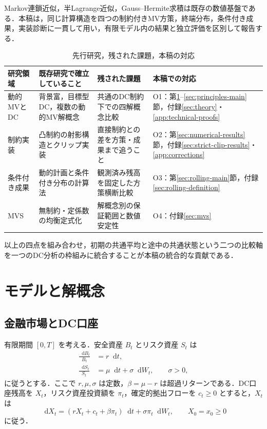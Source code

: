 \documentclass[10pt,a4paper]{article}
\theoremstyle{plain}
\theoremstyle{definition}
\newcommand{\dd}{\mathop{}\!\mathrm{d}}
\begin{document}
Markov連鎖近似，半Lagrange近似，Gauss--Hermite求積は既存の数値基盤である\citep{KushnerDupuis2001,FalconeFerretti2014,AbramowitzStegun1972,Judd1998}．本稿は，同じ計算構造を四つの制約付きMV方策，終端分布，条件付き成果，実装診断に一貫して用い，有限モデル内の結果と独立評価を区別して報告する．

\begin{table}[htbp]
\centering\scriptsize
\caption{先行研究，残された課題，本稿の対応}
\label{tab:literature-positioning}
\begin{tabularx}{\textwidth}{p{24mm}p{39mm}p{42mm}X}
\toprule
研究領域 & 既存研究で確立していること & 残された課題 & 本稿での対応 \\
\midrule
動的MVとDC
& 背景富，目標型DC，複数の動的MV解概念
& 共通のDC制約下での四解概念比較
& O1：第\ref{sec:model}--\ref{sec:principles-main}節，付録\ref{sec:theory}・\ref{app:technical-proofs} \\
制約実装
& 凸制約の射影構造とクリップ実装
& 直接制約との差を方策・成果まで追うこと
& O2：第\ref{sec:numerical-results}節，付録\ref{sec:strict-clip-results}・\ref{app:corrections} \\
条件付き成果
& 動的計画と条件付き分布の計算法
& 観測済み残高を固定した方策横断比較
& O3：第\ref{sec:rolling-main}節，付録\ref{sec:rolling-definition} \\
MVS
& 無制約・定係数の均衡定式化
& 解概念別の保証範囲と数値安定性
& O4：付録\ref{sec:mvs} \\
\bottomrule
\end{tabularx}
\end{table}

以上の四点を組み合わせ，初期の共通平均と途中の共通状態という二つの比較軸を一つのDC分析の枠組みに統合することが本稿の統合的な貢献である．
\section{モデルと解概念}
\label{sec:model}

\subsection{金融市場とDC口座}

有限期間 $[0,T]$ を考える．安全資産 $B_t$ とリスク資産 $S_t$ は
\begin{align}
  \frac{\dd B_t}{B_t}&=r\dd t,\label{eq:riskless}\\
  \frac{\dd S_t}{S_t}&=\mu\dd t+\sigma\dd W_t,\qquad \sigma>0,\label{eq:risky}
\end{align}
に従うとする．ここで $r,\mu,\sigma$ は定数，$\beta=\mu-r$ は超過リターンである．DC口座残高を $X_t$，リスク資産投資額を $\pi_t$，確定的拠出フローを $c_t\geq0$ とすると，$X_t$ は
\begin{equation}
  \dd X_t=(rX_t+c_t+\beta\pi_t)\dd t+\sigma\pi_t\dd W_t,
  \qquad X_0=x_0\geq0
  \label{eq:X-dynamics}
\end{equation}
に従う．
\end{document}
